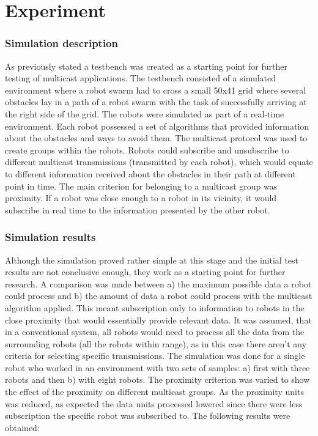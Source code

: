\documentclass[journal]{IEEEtran}
\begin{document}
\section{Experiment}
\subsubsection{Simulation description}
As previously stated a testbench was created as a starting point for further testing of multicast applications.  The testbench consisted of a simulated environment where a robot swarm had to cross a small 50x41 grid where several obstacles lay in a path of a robot swarm with the task of successfully arriving at the right side of the grid. The robots were simulated as part of a real-time environment. Each robot possessed a set of algorithms that provided information about the obstacles and ways to avoid them. The multicast protocol was used to create groups within the robots.  Robots could subscribe and unsubscribe to different multicast transmissions (transmitted by each robot), which would equate to different information received about the obstacles in their path at different point in time. The main criterion for belonging to a multicast group was proximity. If a robot was close enough to a robot in its vicinity, it would subscribe in real time to the information presented by the other robot. 
\subsubsection{Simulation results}
Although the simulation proved rather simple at this stage and the initial test results are not conclusive enough, they work as a starting point for further research. A comparison was made between a) the maximum possible data a robot could process and b) the amount of data a robot could process with the multicast algorithm applied. This meant subscription only to information to robots in the close proximity that would essentially provide relevant data.  It was assumed, that in a conventional system, all robots would need to process all the data from the surrounding robots (all the robots within range), as in this case there aren’t any criteria for selecting specific transmissions. 
The simulation was done for a single robot who worked in an environment with two sets of samples: a) first with three robots and then b) with eight robots. The proximity criterion was varied to show the effect of the proximity on different multicast groups. As the proximity units was reduced, as expected the data units processed lowered since there were less subscription the specific robot was subscribed to.
The following results were obtained:
\end{document}

